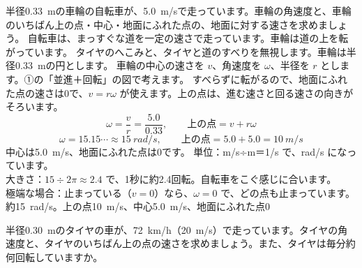 
\begin{phreidai}[自転車の車輪の速さ]\label{ph:力-7:ex1}
半径\qty{0.33}{m}の車輪の自転車が、\qty{5.0}{m/s}で走っています。車輪の角速度と、車輪のいちばん上の点・中心・地面にふれた点の、地面に対する速さを求めましょう。
\phbamen
自転車は、まっすぐな道を一定の速さで走っています。車輪は道の上を転がっています。
\phmushi
タイヤのへこみと、タイヤと道のすべりを無視します。車輪は半径\qty{0.33}{m}の円とします。
\phzu
車輪の中心の速さを $v$、角速度を $\omega$、半径を $r$ とします。①の「並進＋回転」の図で考えます。
\phriyu
すべらずに転がるので、地面にふれた点の速さは0で、$v=r\omega$ が使えます。上の点は、進む速さと回る速さの向きがそろいます。
\phtateru
\[\omega=\frac{v}{r}=\frac{5.0}{0.33},\qquad \text{上の点}=v+r\omega\]
\phtoku
\[\omega=15.15\cdots\approx\qty{15}{rad/s},\qquad \text{上の点}=5.0+5.0=\qty{10}{m/s}\]
中心は\qty{5.0}{m/s}、地面にふれた点は0です。
\phtashikame
単位：m/s÷m＝1/s で、rad/s になっています。\\
大きさ：$15\div2\pi\approx2.4$ で、1秒に約2.4回転。自転車をこぐ感じに合います。\\
極端な場合：止まっている（$v=0$）なら、$\omega=0$ で、どの点も止まっています。
\kotae 約\qty{15}{rad/s}。上の点\qty{10}{m/s}、中心\qty{5.0}{m/s}、地面にふれた点0
\end{phreidai}
\begin{jibun}
半径\qty{0.30}{m}のタイヤの車が、\qty{72}{km/h}（\qty{20}{m/s}）で走っています。タイヤの角速度と、タイヤのいちばん上の点の速さを求めましょう。また、タイヤは毎分約何回転していますか。
\end{jibun}

